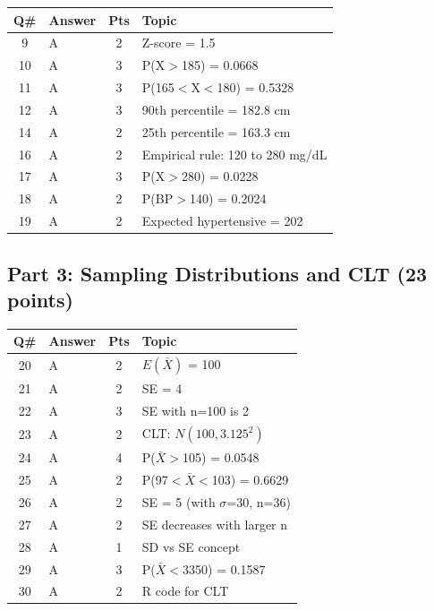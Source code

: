 \documentclass[11pt]{article}
\begin{document}
\begin{table}[h]
\begin{tabular}{clcp{8cm}}
\toprule
\textbf{Q\#} & \textbf{Answer} & \textbf{Pts} & \textbf{Topic} \\
\midrule
9 & \textcolor{correctgreen}{A} & 2 & Z-score = 1.5 \\
10 & \textcolor{correctgreen}{A} & 3 & P(X$>$185) = 0.0668 \\
11 & \textcolor{correctgreen}{A} & 3 & P(165$<$X$<$180) = 0.5328 \\
12 & \textcolor{correctgreen}{A} & 3 & 90th percentile = 182.8 cm \\
14 & \textcolor{correctgreen}{A} & 2 & 25th percentile = 163.3 cm \\
16 & \textcolor{correctgreen}{A} & 2 & Empirical rule: 120 to 280 mg/dL \\
17 & \textcolor{correctgreen}{A} & 3 & P(X$>$280) = 0.0228 \\
18 & \textcolor{correctgreen}{A} & 2 & P(BP$>$140) = 0.2024 \\
19 & \textcolor{correctgreen}{A} & 2 & Expected hypertensive = 202 \\
\bottomrule
\end{tabular}
\end{table}

\subsection*{Part 3: Sampling Distributions and CLT (23 points)}

\begin{table}[h]
\begin{tabular}{clcp{8cm}}
\toprule
\textbf{Q\#} & \textbf{Answer} & \textbf{Pts} & \textbf{Topic} \\
\midrule
20 & \textcolor{correctgreen}{A} & 2 & $E(\bar{X})$ = 100 \\
21 & \textcolor{correctgreen}{A} & 2 & SE = 4 \\
22 & \textcolor{correctgreen}{A} & 3 & SE with n=100 is 2 \\
23 & \textcolor{correctgreen}{A} & 2 & CLT: $N(100, 3.125^2)$ \\
24 & \textcolor{correctgreen}{A} & 4 & P($\bar{X}$$>$105) = 0.0548 \\
25 & \textcolor{correctgreen}{A} & 2 & P(97$<$$\bar{X}$$<$103) = 0.6629 \\
26 & \textcolor{correctgreen}{A} & 2 & SE = 5 (with $\sigma$=30, n=36) \\
27 & \textcolor{correctgreen}{A} & 2 & SE decreases with larger n \\
28 & \textcolor{correctgreen}{A} & 1 & SD vs SE concept \\
29 & \textcolor{correctgreen}{A} & 3 & P($\bar{X}$$<$3350) = 0.1587 \\
30 & \textcolor{correctgreen}{A} & 2 & R code for CLT \\
\bottomrule
\end{tabular}
\end{table}
\end{document}
